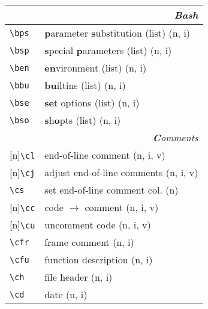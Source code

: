 \documentclass[oneside,11pt,landscape,DIV16]{scrartcl}
\newcommand{\Rep}{{\scriptsize{[n]}}}
\begin{document}
\begin{multicols}{3}
\begin{center}
\begin{tabular}[]{|p{11mm}|p{60mm}|}
\hline 
\multicolumn{2}{|r|}{\textsl{\textbf{B}ash}}\\[1.0ex]
\hline \verb'\bps'   & \textbf{p}arameter \textbf{s}ubstitution (list) \hfill (n, i)\\
\hline \verb'\bsp'   & \textbf{s}pecial \textbf{p}arameters (list)     \hfill (n, i)\\
\hline \verb'\ben'   & \textbf{en}vironment (list)                     \hfill (n, i)\\
\hline \verb'\bbu'   & \textbf{bu}iltins (list)                        \hfill (n, i)\\
\hline \verb'\bse'   & \textbf{se}t options (list)                     \hfill (n, i)\\
\hline \verb'\bso'   & \textbf{s}h\textbf{o}pts (list)                 \hfill (n, i)\\
\hline 
\hline
\multicolumn{2}{|r|}{\textsl{\textbf{C}omments}}                       \\[1.0ex]
\hline \Rep\verb'\cl'   & end-of-line comment               \hfill (n, i, v)\\
\hline \Rep\verb'\cj'   & adjust end-of-line comments       \hfill (n, i, v)\\
\hline     \verb'\cs'   & set end-of-line comment col.      \hfill (n)\\
%
\hline \Rep\verb'\cc'   & code $\rightarrow$ comment        \hfill (n, i, v)\\
\hline \Rep\verb'\cu'   & uncomment code                    \hfill (n, i, v)\\
%
\hline     \verb'\cfr'  & frame comment                     \hfill (n, i)\\
\hline     \verb'\cfu'  & function description              \hfill (n, i)\\
\hline     \verb'\ch'   & file header                       \hfill (n, i)\\
\hline     \verb'\cd'   & date                              \hfill (n, i)\\

\end{tabular}
\end{center}
\end{multicols}
\end{document}
